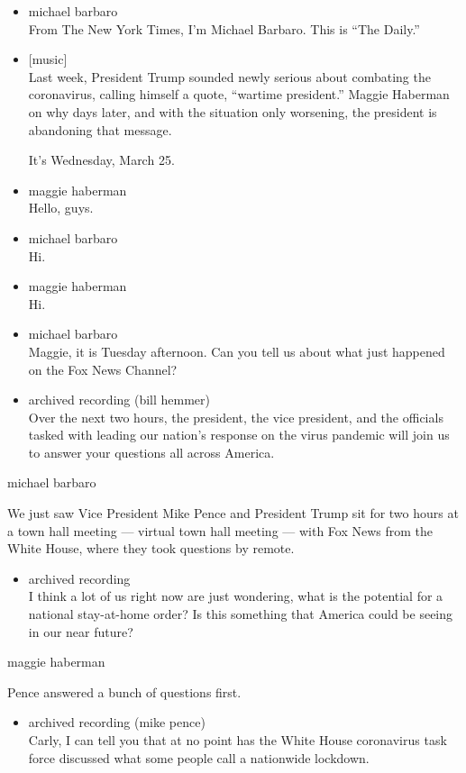 \begin{itemize}
\item
  michael barbaro\\
  From The New York Times, I'm Michael Barbaro. This is ``The Daily.''
\item
  {[}music{]}\\
  Last week, President Trump sounded newly serious about combating the
  coronavirus, calling himself a quote, ``wartime president.'' Maggie
  Haberman on why days later, and with the situation only worsening, the
  president is abandoning that message.

  It's Wednesday, March 25.
\item
  maggie haberman\\
  Hello, guys.
\item
  michael barbaro\\
  Hi.
\item
  maggie haberman\\
  Hi.
\item
  michael barbaro\\
  Maggie, it is Tuesday afternoon. Can you tell us about what just
  happened on the Fox News Channel?
\item
  archived recording (bill hemmer)\\
  Over the next two hours, the president, the vice president, and the
  officials tasked with leading our nation's response on the virus
  pandemic will join us to answer your questions all across America.
\end{itemize}

michael barbaro

We just saw Vice President Mike Pence and President Trump sit for two
hours at a town hall meeting --- virtual town hall meeting --- with Fox
News from the White House, where they took questions by remote.

\begin{itemize}
\tightlist
\item
  archived recording\\
  I think a lot of us right now are just wondering, what is the
  potential for a national stay-at-home order? Is this something that
  America could be seeing in our near future?
\end{itemize}

maggie haberman

Pence answered a bunch of questions first.

\begin{itemize}
\tightlist
\item
  archived recording (mike pence)\\
  Carly, I can tell you that at no point has the White House coronavirus
  task force discussed what some people call a nationwide lockdown.
\end{itemize}

